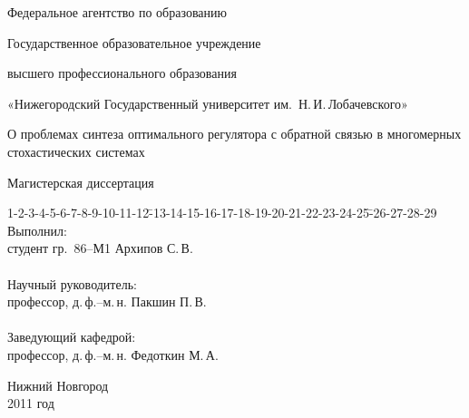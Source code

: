 
\begin{titlepage}
    \begin{center}
        \par Федеральное агентство по образованию\vspace{0.7mm}
        \par Государственное образовательное учреждение\vspace{0.7mm}
        \par высшего профессионального образования\vspace{1.5mm}
        \par «Нижегородский Государственный университет им.~Н.\,И.\,Лобачевского»
        \vspace{1cm}
        {\fontsize{18pt}{9mm}  \selectfont
            \par О проблемах синтеза оптимального регулятора с обратной связью в многомерных стохастических системах
        }
        \vspace{2cm}
        \par {\large Магистерская диссертация}
    \end{center}
    \vspace{2cm}
    \begin{tabbing}
        1-2-3-4-5-6-7-8-9-10-11-12\=-13-14-15-16-17-18-19-20-21-22-23-24-25\=-26-27-28-29 \kill
        {\fontsize{10pt}{10pt} \selectfont Выполнил:}                 \>                      \>                 \\
        {\fontsize{10pt}{10pt} \selectfont студент гр.~86--М1}        \>                      \> {\fontsize{10pt}{10pt} \selectfont Архипов С.\,В.}  \\
        \\
        {\fontsize{10pt}{10pt} \selectfont Научный руководитель:}     \>                      \>                 \\
        {\fontsize{10pt}{10pt} \selectfont профессор, д.\,ф.--м.\,н.} \>                      \> {\fontsize{10pt}{10pt} \selectfont Пакшин П.\,В.}   \\
        \\
        {\fontsize{10pt}{10pt} \selectfont Заведующий кафедрой:}     \>                      \>                 \\
        {\fontsize{10pt}{10pt} \selectfont профессор, д.\,ф.--м.\,н.} \>                      \> {\fontsize{10pt}{10pt} \selectfont Федоткин М.\,А.}
    \end{tabbing}
    \vspace{3cm}
    \begin{center} {\fontsize{10pt}{3mm}  \selectfont
        Нижний Новгород \\
        2011 год
    } \end{center}
\end{titlepage}

